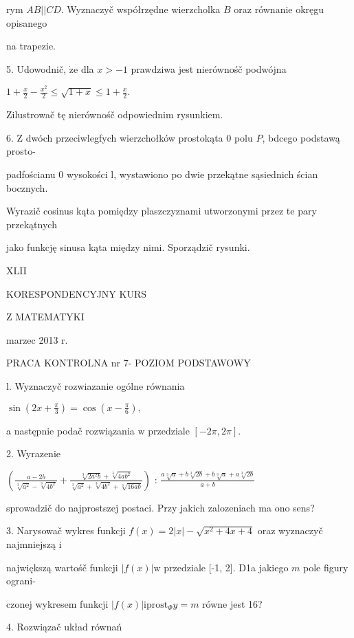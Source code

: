 \documentclass[a4paper,12pt]{article}
\begin{document}
rym $AB||CD$. Wyznaczyč współrzędne wierzcholka $B$ oraz równanie okręgu opisanego

na trapezie.

5. Udowodnič, $\dot{\mathrm{z}}\mathrm{e}$ dla $x>-1$ prawdziwa jest nierównośč podwójna

$1+\displaystyle \frac{x}{2}-\frac{x^{2}}{2}\leq\sqrt{1+x}\leq 1+\frac{x}{2}.$

Zilustrowač tę nierównośč odpowiednim rysunkiem.

6. $\mathrm{Z}$ dwóch przeciwlegfych wierzchołków prostokąta $0$ polu $P$, bdcego podstawą prosto-

padfościanu $0$ wysokości l, wystawiono po dwie przekątne sąsiednich ścian bocznych.

Wyrazič cosinus kąta pomiędzy plaszczyznami utworzonymi przez te pary przekątnych

jako funkcję sinusa kąta między nimi. Sporządzič rysunki.





XLII

KORESPONDENCYJNY KURS

Z MATEMATYKI

marzec 2013 r.

PRACA KONTROLNA nr 7- POZIOM PODSTAWOWY

l. Wyznaczyč rozwiazanie ogólne równania

$\displaystyle \sin(2x+\frac{\pi}{3})=\cos(x-\frac{\pi}{6}),$

a następnie podač rozwiązania $\mathrm{w}$ przedziale $[-2\pi,2\pi].$

2. Wyrazenie

$(\displaystyle \frac{a-2b}{\sqrt[3]{a^{2}}-\sqrt[3]{4b^{2}}}+\frac{\sqrt[3]{2a^{2}b}+\sqrt[3]{4ab^{2}}}{\sqrt[3]{a^{2}}+\sqrt[3]{4b^{2}}+\sqrt[3]{16ab}})$ : $\displaystyle \frac{a\sqrt[3]{a}+b\sqrt[3]{2b}+b\sqrt[3]{a}+a\sqrt[3]{2b}}{a+b}$

sprowadzič do najprostszej postaci. Przy jakich zalozeniach ma ono sens?

3. Narysowač wykres funkcji $f(x) =2|x|-\sqrt{x^{2}+4x+4}$ oraz wyznaczyč najmniejszą $\mathrm{i}$

największą wartośč funkcji $|f(x)|\mathrm{w}$ przedziale [-1, 2]. D1a jakiego $m$ pole figury ograni-

czonej wykresem funkcji $|f(x)|\mathrm{i}\mathrm{p}\mathrm{r}\mathrm{o}\mathrm{s}\mathrm{t}_{\Phi}y=m$ równe jest 16?

4. Rozwiązač układ równań
\end{document}
